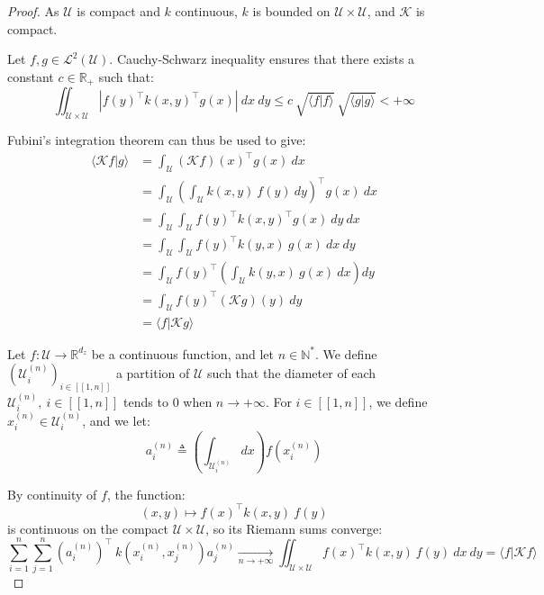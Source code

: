 \begin{proof}
	As $\mathcal{U}$ is compact and $k$ continuous, $k$ is bounded on $\mathcal{U}\times\mathcal{U}$, and $\mathcal{K}$ is compact.

	Let $f,g\in\mathcal{L}^2(\mathcal{U})$. Cauchy-Schwarz inequality ensures that there exists a constant $c\in\mathbb{R}_+$ such that:
	\begin{equation}
		\iint_{\mathcal{U}\times\mathcal{U}}{\left|f(y)^\top k(x,y)^\top g(x)\right|\:dx\:dy}\leq c\:\sqrt{\langle f|f\rangle}\:\sqrt{\langle g|g\rangle}<+\infty
	\end{equation}

	Fubini's integration theorem can thus be used to give:
	\begin{equation}
		\begin{aligned}
		\langle\mathcal{K}f|g\rangle&=\int_{\mathcal{U}}{(\mathcal{K}f)(x)^\top g(x)\:dx}\\
		&=\int_{\mathcal{U}}{\left(\int_{\mathcal{U}}{k(x,y)\:f(y)\:dy}\right)^\top g(x)\:dx}\\
		&=\int_{\mathcal{U}}{\int_{\mathcal{U}}{f(y)^\top k(x,y)^\top g(x)\:dy}\:dx}\\
		&=\int_{\mathcal{U}}{\int_{\mathcal{U}}{f(y)^\top k(y,x)\:g(x)\:dx}\:dy}\\
		&=\int_{\mathcal{U}}{f(y)^\top\left(\int_{\mathcal{U}}{k(y,x)\:g(x)\:dx}\right)dy}\\
		&=\int_{\mathcal{U}}{f(y)^\top(\mathcal{K}g)(y)\:dy}\\
		&=\langle f|\mathcal{K}g\rangle
		\end{aligned}
	\end{equation}

	Let $f:\mathcal{U}\to\mathbb{R}^{d_z}$ be a continuous function, and let $n\in\mathbb{N}^*$. We define $\left(\mathcal{U}_i^{(n)}\right)_{i\in[\![1,n]\!]}$ a partition of $\mathcal{U}$ such that the diameter of each $\mathcal{U}_i^{(n)},\:i\in[\![1,n]\!]$ tends to $0$ when $n\rightarrow+\infty$. For $i\in[\![1,n]\!]$, we define $x_i^{(n)}\in\mathcal{U}_i^{(n)}$, and we let:
	\begin{equation}
		a_i^{(n)}\triangleq\left(\int_{\mathcal{U}_i^{(n)}}{dx}\right)f\left(x_i^{(n)}\right)
	\end{equation}

	By continuity of $f$, the function:
	\begin{equation}
		(x,y)\mapsto f(x)^\top k(x,y)\:f(y)
	\end{equation}
	is continuous on the compact $\mathcal{U}\times\mathcal{U}$, so its Riemann sums converge:
	\begin{equation}
		\sum_{i=1}^n\sum_{j=1}^n\left(a_i^{(n)}\right)^\top\:k\left(x_i^{(n)},x_j^{(n)}\right)a_j^{(n)}\underset{n\rightarrow+\infty}{\longrightarrow}\iint_{\mathcal{U}\times\mathcal{U}}{f(x)^\top k(x,y)\:f(y)\:dx\:dy}=\langle f|\mathcal{K}f\rangle
	\end{equation}


\end{proof}
